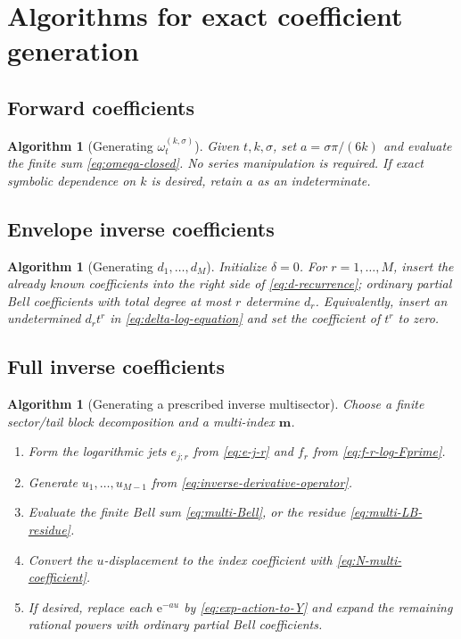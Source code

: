 \documentclass[11pt]{article}
\numberwithin{equation}{section}
\theoremstyle{mainthm}
\theoremstyle{defstyle}
\newtheorem{algorithm}[theorem]{Algorithm}
\theoremstyle{remark}
\newcommand{\e}{\mathrm e}
\begin{document}
\section{Algorithms for exact coefficient generation}\label{sec:algorithms}

\subsection{Forward coefficients}

\begin{algorithm}[Generating \(\omega_t^{(k,\sigma)}\)]
Given \(t,k,\sigma\), set \(a=\sigma\pi/(6k)\) and evaluate the finite sum \eqref{eq:omega-closed}.  No series manipulation is required.  If exact symbolic dependence on \(k\) is desired, retain \(a\) as an indeterminate.
\end{algorithm}

\subsection{Envelope inverse coefficients}

\begin{algorithm}[Generating \(d_1,\ldots,d_M\)]
Initialize \(\delta=0\).  For \(r=1,\ldots,M\), insert the already known coefficients into the right side of \eqref{eq:d-recurrence}; ordinary partial Bell coefficients with total degree at most \(r\) determine \(d_r\).  Equivalently, insert an undetermined \(d_rt^r\) in \eqref{eq:delta-log-equation} and set the coefficient of \(t^r\) to zero.
\end{algorithm}

\subsection{Full inverse coefficients}

\begin{algorithm}[Generating a prescribed inverse multisector]
Choose a finite sector/tail block decomposition and a multi-index \(\bm m\).
\begin{enumerate}
\item Form the logarithmic jets \(e_{j;r}\) from \eqref{eq:e-j-r} and \(f_r\) from \eqref{eq:f-r-log-Fprime}.
\item Generate \(u_1,\ldots,u_{M-1}\) from \eqref{eq:inverse-derivative-operator}.
\item Evaluate the finite Bell sum \eqref{eq:multi-Bell}, or the residue \eqref{eq:multi-LB-residue}.
\item Convert the \(u\)-displacement to the index coefficient with \eqref{eq:N-multi-coefficient}.
\item If desired, replace each \(\e^{-au}\) by \eqref{eq:exp-action-to-Y} and expand the remaining rational powers with ordinary partial Bell coefficients.
\end{enumerate}
\end{algorithm}
\end{document}
